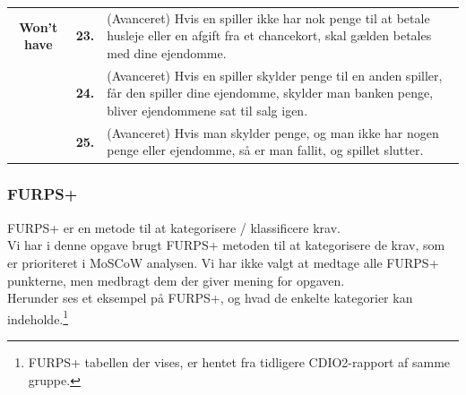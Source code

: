 \begin{center}
\begin{tabular}{ || c | l | p{11.5cm} ||}
    \cline{2-3}
    \textbf{Won't have}
    &
    \textbf{23.}
    &
    (Avanceret) Hvis en spiller ikke har nok penge til at betale husleje eller en afgift fra et chancekort, skal gælden betales med dine ejendomme.
    \\

    \cline{2-3}
    &
    \textbf{24.}
    &
    (Avanceret) Hvis en spiller skylder penge til en anden spiller, får den spiller dine ejendomme, skylder man banken penge, bliver ejendommene sat til salg igen.
    \\

    \cline{2-3}
    &
    \textbf{25.}
    &
    (Avanceret) Hvis man skylder penge, og man ikke har nogen penge eller ejendomme, så er man fallit, og spillet slutter.
    \\

    \hline
    \hline
    \end{tabular}
\end{center}

\subsubsection{FURPS+}

FURPS+ er en metode til at kategorisere / klassificere krav. \\
Vi har i denne opgave brugt FURPS+ metoden til at kategorisere de krav, som er prioriteret i MoSCoW analysen.
Vi har ikke valgt at medtage alle FURPS+ punkterne, men medbragt dem der giver mening for opgaven. \\
Herunder ses et eksempel på FURPS+, og hvad de enkelte kategorier kan indeholde.\footnote{FURPS+ tabellen der vises, er hentet fra tidligere CDIO2-rapport af samme gruppe.}

